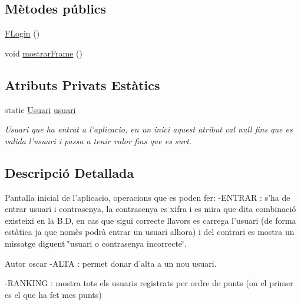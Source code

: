 \subsection*{Mètodes públics}
\begin{DoxyCompactItemize}
\item 
\hyperlink{classinterficie_1_1_f_login_aaf7f6176fa95d3cbf4cadfb5a7825d3a}{F\+Login} ()
\item 
void \hyperlink{classinterficie_1_1_f_login_a3e513170e07fbdf064de277557a3fc5d}{mostrar\+Frame} ()
\end{DoxyCompactItemize}
\subsection*{Atributs Privats Estàtics}
\begin{DoxyCompactItemize}
\item 
\hypertarget{classinterficie_1_1_f_login_ab22f042e985a7d97bb5a07ffd2585fa5}{static \hyperlink{classlogica_1_1_usuari}{Usuari} \hyperlink{classinterficie_1_1_f_login_ab22f042e985a7d97bb5a07ffd2585fa5}{usuari}}\label{classinterficie_1_1_f_login_ab22f042e985a7d97bb5a07ffd2585fa5}

\begin{DoxyCompactList}\small\item\em Usuari que ha entrat a l'aplicacio, en un inici aquest atribut val null fins que es valida l'usuari i passa a tenir valor fins que es surt. \end{DoxyCompactList}\end{DoxyCompactItemize}


\subsection{Descripció Detallada}
Pantalla inicial de l'aplicacio, operacions que es poden fer\+: -\/\+E\+N\+T\+R\+A\+R \+: s'ha de entrar usuari i contrasenya, la contrasenya es xifra i es mira que dita combinació existeixi en la B.\+D, en cas que sigui correcte llavors es carrega l'usuari (de forma estàtica ja que nomès podrà entrar un usuari alhora) i del contrari es mostra un missatge diguent \char`\"{}usuari o contrasenya incorrecte\char`\"{}. 

\begin{DoxyAuthor}{Autor}
oscar -\/\+A\+L\+T\+A \+: permet donar d'alta a un nou usuari.
\end{DoxyAuthor}
-\/\+R\+A\+N\+K\+I\+N\+G \+: mostra tots els usuaris registrats per ordre de punts (on el primer es el que ha fet mes punts)

